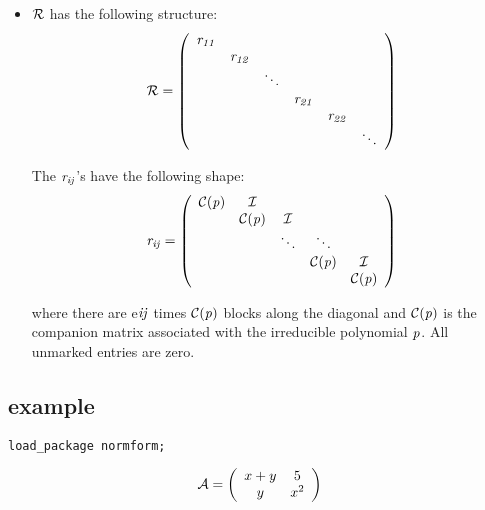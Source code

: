 \begin{itemize}
\item ${\cal R}$ has the following structure:
      \begin{displaymath}
      {\cal R} = \left( \begin{array}{cccccc} {\it r_{11}} \\  &
      {\it r_{12}} \\  &  & \ddots \\  &  &  & {\it r_{21}}  \\ &  &
      &  & {\it r_{22}} \\ &  &  &  &  & \ddots \end{array} \right)
      \end{displaymath}

      The ${\it r_{ij}}$'s have the following shape:
      \begin{displaymath}
      {\it r_{ij}} = \left( \begin{array}{ccccc} {\cal C}({\it p}) &
      {\cal I}  &  &  & \\  &  {\cal C}({\it p}) & {\cal I}  & & \\ &
      & \ddots & \ddots & \\ &  &  &  {\cal C}({\it p}) & {\cal I} \\ &
      &  &  & {\cal C}({\it p}) \end{array} \right)
      \end{displaymath}

      where there are e${\it ij}$ times ${\cal C}({\it p})$ blocks
      along the diagonal and ${\cal C}({\it p})$ is the companion
      matrix  associated with the irreducible polynomial ${\it p}$. All
      unmarked entries are zero.
\end{itemize}

\subsection{example}

{\tt load\_package normform;}

\begin{displaymath}
{\cal A} = \left( \begin{array}{cc} x+y & 5 \\ y & x^2  \end{array}
\right)
\end{displaymath}

